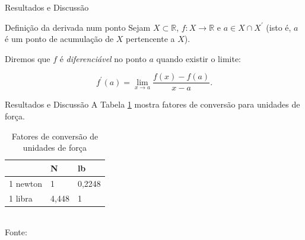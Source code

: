 \begin{frame}{Resultados e Discussão}
    \begin{block}{Definição da derivada num ponto \cite{lima-analise}}
        Sejam $X \subset \mathbb{R}$, $f: X \rightarrow \mathbb{R}$ e $a \in X \cap X^\prime$ (isto é, $a$ é um ponto de acumulação de $X$ pertencente a $X$).

        Diremos que $f$ é \textit{diferenciável} no ponto $a$ quando existir o limite:

        $$
        f^{\prime}(a) = \lim_{x \rightarrow a} \dfrac{f(x)-f(a)}{x-a}.
        $$
    \end{block}
\end{frame}

\begin{frame}{Resultados e Discussão}
    A Tabela \ref{tab:forca} mostra fatores de conversão para unidades de força.
    \vfill
    \begin{table}[H]
        \centering
        \caption{Fatores de conversão de unidades de força}
        \label{tab:forca}
        \begin{tabular}{l l l}
            \hline 
             & N & lb\\ \hline
             1 newton & 1 & 0,2248\\ 
             1 libra & 4,448 & 1\\ \hline
        \end{tabular}
        \\
        \footnotesize{Fonte: }
    \end{table}
\end{frame}

